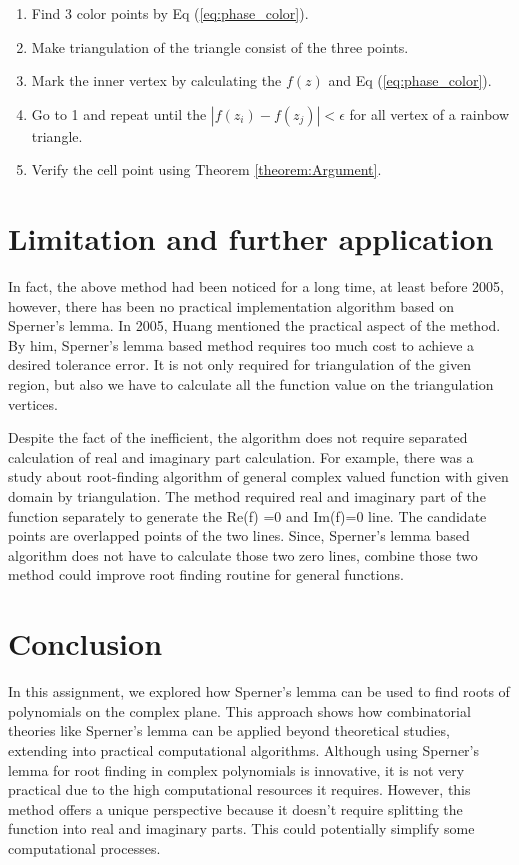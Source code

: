 \documentclass[a4paper,12pt]{article}
\begin{document}
\begin{enumerate}
    \item Find 3 color points by Eq (\ref{eq:phase_color}).
    \item Make triangulation of the triangle consist of the three points.
    \item Mark the inner vertex by calculating the $f(z)$ and Eq (\ref{eq:phase_color}).
    \item Go to 1 and repeat until the $|f(z_i) - f(z_j)| < \epsilon$ for all vertex of a rainbow triangle.
    \item Verify the cell point using Theorem \ref{theorem:Argument}.
\end{enumerate}


\section{Limitation and further application}

In fact, the above method had been noticed for a long time,
at least before 2005, however, there has been no practical implementation algorithm based on 
Sperner's lemma. 
In 2005, Huang mentioned the practical aspect of the method. 
By him, Sperner's lemma based method requires too much cost
to achieve a desired tolerance error. 
It is not only required for triangulation of the given region,
but also we have to calculate all the function value on the triangulation vertices.

Despite the fact of the inefficient, 
the algorithm does not require 
separated calculation of real and imaginary part calculation.
For example, there was a study about root-finding algorithm
of general complex valued function with given domain by triangulation\cite{10.1145/2699457}.
The method required real and imaginary part of the function separately
to generate the Re(f) =0 and Im(f)=0 line.
The candidate points are overlapped points of the two lines.
Since, Sperner's lemma based algorithm does not have to calculate 
those two zero lines, combine those two method could improve 
root finding routine for general functions.


\section{Conclusion}

In this assignment, we explored how Sperner's lemma can be used to find roots of polynomials on the complex plane. 
This approach shows how combinatorial theories like Sperner's lemma can be applied beyond theoretical studies, 
extending into practical computational algorithms.
Although using Sperner's lemma for root finding in complex polynomials is innovative, 
it is not very practical due to the high computational resources it requires. 
However, this method offers a unique perspective because it doesn't require splitting the function into real and imaginary parts. 
This could potentially simplify some computational processes.
\end{document}
